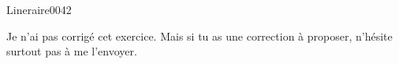 \begin{corrige}{Lineraire0042}

	Je n'ai pas corrigé cet exercice. Mais si tu as une correction à proposer, n'hésite surtout pas à me l'envoyer.

\end{corrige}
